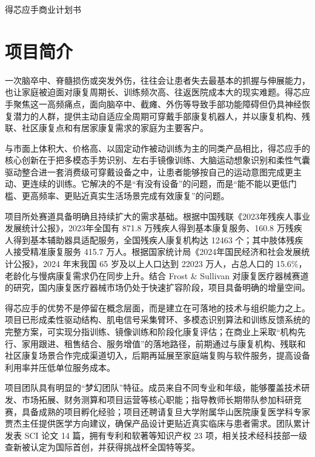 \documentclass[a4paper]{ctexart}
\newcommand{\SongBold}{\CJKfontspec[FakeBold=2.5]{SimSun}}
\newcommand{\ReportTitle}[1]{%
  \begin{center}
    \SongBold\fontsize{18bp}{22bp}\selectfont #1
  \end{center}
}
\begin{document}

\ReportTitle{得芯应手商业计划书}


\section{项目简介}

一次脑卒中、脊髓损伤或突发外伤，往往会让患者失去最基本的抓握与伸展能力，也让家庭被迫面对康复周期长、训练频次高、往返医院成本大的现实难题。得芯应手聚焦这一高频痛点，面向脑卒中、截瘫、外伤等导致手部功能障碍但仍具神经恢复潜力的人群，提供主动自适应全周期可穿戴手部康复机器人，并以康复机构、残联、社区康复点和有居家康复需求的家庭为主要客户。

与市面上体积大、价格高、以固定动作被动训练为主的同类产品相比，得芯应手的核心创新在于把多模态手势识别、左右手镜像训练、大脑运动想象识别和柔性气囊驱动整合进一套消费级可穿戴设备之中，让患者能够按自己的运动意图完成更主动、更连续的训练。它解决的不是“有没有设备”的问题，而是“能不能以更低门槛、更高频率、更贴近真实生活场景完成有效康复”的问题。

项目所处赛道具备明确且持续扩大的需求基础。根据中国残联《2023年残疾人事业发展统计公报》，2023年全国有 871.8 万残疾人得到基本康复服务、160.8 万残疾人得到基本辅助器具适配服务，全国残疾人康复机构达 12463 个；其中肢体残疾人接受精准康复服务 415.7 万人。根据国家统计局《2024年国民经济和社会发展统计公报》，2024 年末我国 65 岁及以上人口达到 22023 万人，占总人口的 15.6\%，老龄化与慢病康复需求仍在同步上升。结合 Frost \& Sullivan 对康复医疗器械赛道的研究，国内康复医疗器械市场仍处于快速扩容阶段，项目具备明确的增量空间。

得芯应手的优势不是停留在概念层面，而是建立在可落地的技术与组织能力之上。项目已形成柔性驱动结构、肌电信号采集臂环、多模态识别算法和训练反馈系统的完整方案，可实现分指训练、镜像训练和阶段化康复评估；在商业上采取“机构先行、家用跟进、租售结合、服务增值”的落地路径，前期通过与康复机构、残联和社区康复场景合作完成渠道切入，后期再延展至家庭端复购与软件服务，提高设备利用率并压低单位服务成本。

项目团队具有明显的“梦幻团队”特征。成员来自不同专业和年级，能够覆盖技术研发、市场拓展、财务测算和项目运营等核心职能；指导教师长期带队参加科研竞赛，具备成熟的项目孵化经验；项目还聘请复旦大学附属华山医院康复医学科专家贾杰主任提供医学方向建议，确保产品设计更贴近真实临床与患者需求。团队累计发表 SCI 论文 14 篇，拥有专利和软著等知识产权 23 项，相关技术经科技部一级查新被认定为国际首创，并获得挑战杯全国特等奖。
\end{document}
